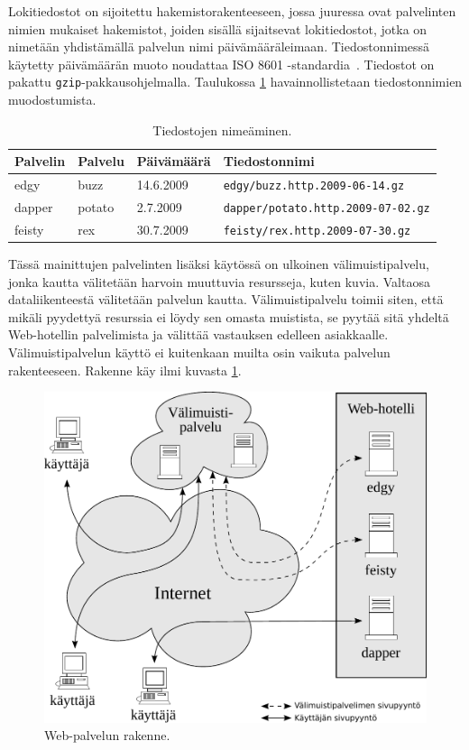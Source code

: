 Lokitiedostot on sijoitettu hakemistorakenteeseen, jossa juuressa ovat
palvelinten nimien mukaiset hakemistot, joiden sisällä sijaitsevat
lokitiedostot, jotka on nimetään yhdistämällä palvelun nimi
päivämääräleimaan. Tiedostonnimessä käytetty päivämäärän muoto
noudattaa ISO 8601 -standardia~\cite{iso8601}. Tiedostot on pakattu
\texttt{gzip}-pakkausohjelmalla. Taulukossa \ref{tiedostot}
havainnollistetaan tiedostonnimien muodostumista.

\begin{table}[h]
\centering
\begin{tabular}{llll}
Palvelin & Palvelu & Päivämäärä & Tiedostonnimi \\
\hline
edgy & buzz & 14.6.2009 & \texttt{edgy/buzz.http.2009-06-14.gz}\\ 
dapper & potato & 2.7.2009 & \texttt{dapper/potato.http.2009-07-02.gz}\\
feisty & rex & 30.7.2009 & \texttt{feisty/rex.http.2009-07-30.gz}\\
\end{tabular}
\caption{Tiedostojen nimeäminen.}
\label{tiedostot}
\end{table}

Tässä mainittujen palvelinten lisäksi käytössä on ulkoinen
välimuistipalvelu, jonka kautta välitetään harvoin muuttuvia
resursseja, kuten kuvia. Valtaosa dataliikenteestä
välitetään palvelun kautta. Välimuistipalvelu toimii siten, että
mikäli pyydettyä resurssia ei löydy sen omasta muistista, se pyytää
sitä yhdeltä Web-hotellin palvelimista ja välittää vastauksen edelleen
asiakkaalle. Välimuistipalvelun käyttö ei kuitenkaan muilta osin
vaikuta palvelun rakenteeseen. Rakenne käy ilmi kuvasta
\ref{palvelinrakenne}.

\begin{figure}[htp]
\centering
\includegraphics[width=12cm]{pics/palvelinrakenne.pdf}
\caption{Web-palvelun rakenne.}
\label{palvelinrakenne}
\end{figure}


